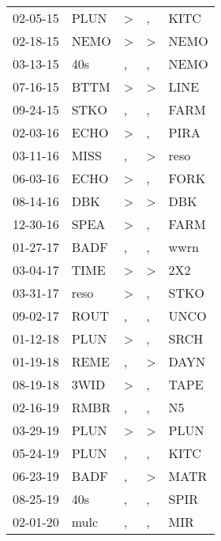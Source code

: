\begin{supertabular}{lllll}
 02-05-15 &   PLUN &     \textgreater &                , &   KITC \\
 02-18-15 &   NEMO &     \textgreater &     \textgreater &   NEMO \\
 03-13-15 &    40s &                , &                , &   NEMO \\
 07-16-15 &   BTTM &     \textgreater &     \textgreater &   LINE \\
 09-24-15 &   STKO &                , &                , &   FARM \\
 02-03-16 &   ECHO &     \textgreater &                , &   PIRA \\
 03-11-16 &   MISS &                , &     \textgreater &   reso \\
 06-03-16 &   ECHO &     \textgreater &                , &   FORK \\
 08-14-16 &    DBK &     \textgreater &     \textgreater &    DBK \\
 12-30-16 &   SPEA &     \textgreater &                , &   FARM \\
 01-27-17 &   BADF &                , &                , &   wwrn \\
 03-04-17 &   TIME &     \textgreater &     \textgreater &    2X2 \\
 03-31-17 &   reso &     \textgreater &                , &   STKO \\
 09-02-17 &   ROUT &                , &                , &   UNCO \\
 01-12-18 &   PLUN &     \textgreater &                , &   SRCH \\
 01-19-18 &   REME &                , &     \textgreater &   DAYN \\
 08-19-18 &   3WID &     \textgreater &                , &   TAPE \\
 02-16-19 &   RMBR &                , &                , &     N5 \\
 03-29-19 &   PLUN &     \textgreater &     \textgreater &   PLUN \\
 05-24-19 &   PLUN &                , &                , &   KITC \\
 06-23-19 &   BADF &                , &     \textgreater &   MATR \\
 08-25-19 &    40s &                , &                , &   SPIR \\
 02-01-20 &   mulc &                , &                , &    MIR \\
\end{supertabular}
